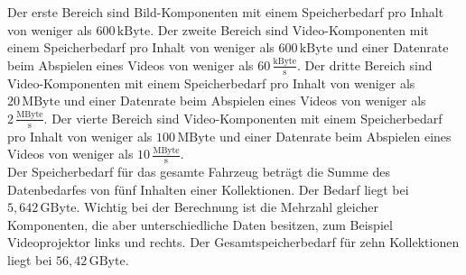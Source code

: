 Der erste Bereich sind Bild-Komponenten mit einem Speicherbedarf pro Inhalt von weniger als $ 600\,\mathrm{kByte} $. Der zweite Bereich sind Video-Komponenten mit einem Speicherbedarf pro Inhalt von weniger als $ 600\,\mathrm{kByte} $ und einer Datenrate beim Abspielen eines Videos von weniger als $ 60\,\frac{\mathrm{kByte}}{\mathrm{s}} $. Der dritte Bereich sind Video-Komponenten mit einem Speicherbedarf pro Inhalt von weniger als $ 20\,\mathrm{MByte} $ und einer Datenrate beim Abspielen eines Videos von weniger als $ 2\,\frac{\mathrm{MByte}}{\mathrm{s}} $. Der vierte Bereich sind Video-Komponenten mit einem Speicherbedarf pro Inhalt von weniger als $ 100\,\mathrm{MByte} $ und einer Datenrate beim Abspielen eines Videos von weniger als $ 10\,\frac{\mathrm{MByte}}{\mathrm{s}} $. \\
Der Speicherbedarf für das gesamte Fahrzeug beträgt die Summe des Datenbedarfes von fünf Inhalten einer Kollektionen. Der Bedarf liegt bei $ 5,642\,\mathrm{GByte} $. Wichtig bei der Berechnung ist die Mehrzahl gleicher Komponenten, die aber unterschiedliche Daten besitzen, zum Beispiel Videoprojektor links und rechts. Der Gesamtspeicherbedarf für zehn Kollektionen liegt bei $ 56,42\,\mathrm{GByte} $.
